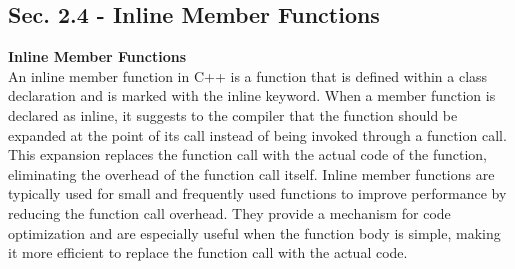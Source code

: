 \subsection*{Sec. 2.4 - Inline Member Functions}
\noindent \textbf{Inline Member Functions} \\

An inline member function in C++ is a function that is defined within a class declaration and is marked with the inline keyword. When a member function is declared as inline, it suggests to the compiler that 
the function should be expanded at the point of its call instead of being invoked through a function call. This expansion replaces the function call with the actual code of the function, eliminating the overhead 
of the function call itself. Inline member functions are typically used for small and frequently used functions to improve performance by reducing the function call overhead. They provide a mechanism for code 
optimization and are especially useful when the function body is simple, making it more efficient to replace the function call with the actual code. \\

